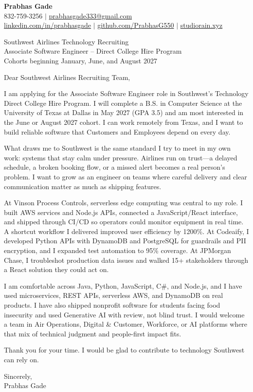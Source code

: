 \documentclass[letterpaper,11pt]{letter}
\begin{document}
\begin{flushleft}
\textbf{\large Prabhas Gade}\\
832-759-3256 $|$ \href{mailto:prabhasgade333@gmail.com}{prabhasgade333@gmail.com}\\
\href{https://linkedin.com/in/prabhasgade}{linkedin.com/in/prabhasgade} $|$
\href{https://github.com/PrabhasG550}{github.com/PrabhasG550} $|$
\href{https://studiorain.xyz}{studiorain.xyz}
\end{flushleft}

\vspace{6pt}
\begin{flushleft}
Southwest Airlines Technology Recruiting\\
Associate Software Engineer -- Direct College Hire Program\\
Cohorts beginning January, June, and August 2027
\end{flushleft}

Dear Southwest Airlines Recruiting Team,

I am applying for the Associate Software Engineer role in Southwest's Technology Direct College Hire Program. I will complete a B.S. in Computer Science at the University of Texas at Dallas in May 2027 (GPA 3.5) and am most interested in the June or August 2027 cohort. I can work remotely from Texas, and I want to build reliable software that Customers and Employees depend on every day.

What draws me to Southwest is the same standard I try to meet in my own work: systems that stay calm under pressure. Airlines run on trust---a delayed schedule, a broken booking flow, or a missed alert becomes a real person's problem. I want to grow as an engineer on teams where careful delivery and clear communication matter as much as shipping features.

At Vinson Process Controls, serverless edge computing was central to my role. I built AWS services and Node.js APIs, connected a JavaScript/React interface, and shipped through CI/CD so operators could monitor equipment in real time. A shortcut workflow I delivered improved user efficiency by 1200\%. At Codeaify, I developed Python APIs with DynamoDB and PostgreSQL for guardrails and PII encryption, and I expanded test automation to 95\% coverage. At JPMorgan Chase, I troubleshot production data issues and walked 15+ stakeholders through a React solution they could act on.

I am comfortable across Java, Python, JavaScript, C\#, and Node.js, and I have used microservices, REST APIs, serverless AWS, and DynamoDB on real products. I have also shipped nonprofit software for students facing food insecurity and used Generative AI with review, not blind trust. I would welcome a team in Air Operations, Digital \& Customer, Workforce, or AI platforms where that mix of technical judgment and people-first impact fits.

Thank you for your time. I would be glad to contribute to technology Southwest can rely on.

Sincerely,\\
Prabhas Gade
\end{document}
